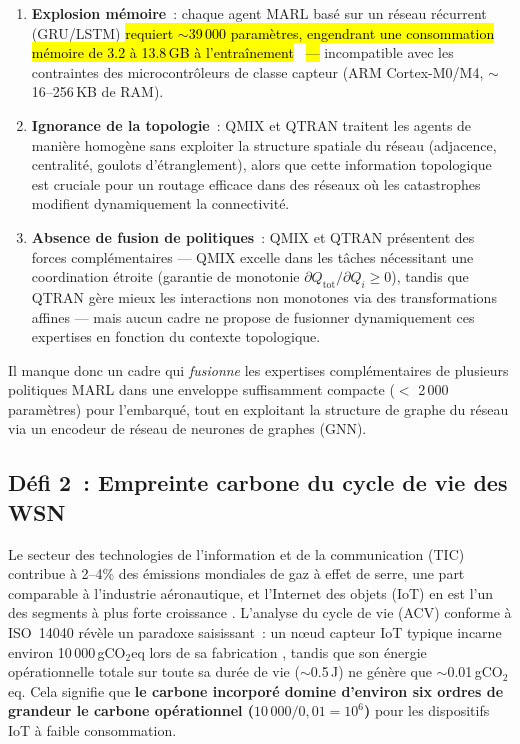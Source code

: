 \begin{enumerate}
    \item \textbf{Explosion mémoire}~: chaque agent MARL basé sur un réseau récurrent (GRU/LSTM) \hl{requiert $\sim$39\,000 paramètres, engendrant une consommation mémoire de 3.2 à 13.8\,GB à l'entraînement}~\cite{rashid2018qmix,son2019qtran}\hl{ ---} incompatible avec les contraintes des microcontrôleurs de classe capteur (ARM Cortex-M0/M4, $\sim$16--256\,KB de RAM).
    \item \textbf{Ignorance de la topologie}~: QMIX et QTRAN traitent les agents de manière homogène sans exploiter la structure spatiale du réseau (adjacence, centralité, goulots d'étranglement), alors que cette information topologique est cruciale pour un routage efficace dans des réseaux où les catastrophes modifient dynamiquement la connectivité.
    \item \textbf{Absence de fusion de politiques}~: QMIX et QTRAN présentent des forces complémentaires --- QMIX excelle dans les tâches nécessitant une coordination étroite (garantie de monotonie $\partial Q_\text{tot}/\partial Q_i \geq 0$), tandis que QTRAN gère mieux les interactions non monotones via des transformations affines --- mais aucun cadre ne propose de fusionner dynamiquement ces expertises en fonction du contexte topologique.
\end{enumerate}

Il manque donc un cadre qui \emph{fusionne} les expertises complémentaires de plusieurs politiques MARL dans une enveloppe suffisamment compacte ($<$ 2\,000 paramètres) pour l'embarqué, tout en exploitant la structure de graphe du réseau via un encodeur de réseau de neurones de graphes (GNN).


\subsection{Défi 2~: Empreinte carbone du cycle de vie des WSN}

Le secteur des technologies de l'information et de la communication (TIC) contribue à 2--4\% des émissions mondiales de gaz à effet de serre, une part comparable à l'industrie aéronautique, et l'Internet des objets (IoT) en est l'un des segments à plus forte croissance \cite{freitag2021ict,andrae2021real_climate,itu_ict2025}. L'analyse du cycle de vie (ACV) conforme à ISO~14040 \cite{iso14040} révèle un paradoxe saisissant~: un n\oe{}ud capteur IoT typique incarne environ 10\,000\,gCO$_2$eq lors de sa fabrication \cite{pirson2021embodied}, tandis que son énergie opérationnelle totale sur toute sa durée de vie ($\sim$0.5\,J) ne génère que $\sim$0.01\,gCO$_2$eq. Cela signifie que \textbf{le carbone incorporé domine d'environ six ordres de grandeur le carbone opérationnel ($10\,000/0{,}01 = 10^6$)} pour les dispositifs IoT à faible consommation.

